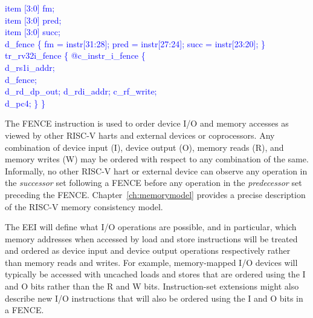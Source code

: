 \textcolor{blue}{
   item [3:0] fm;\\%
\indent item [3:0] pred;\\%
\indent item [3:0] succ;\\%
\indent d\_fence \{ fm = instr[31:28]; pred = instr[27:24]; succ = instr[23:20]; \}\\%
\indent tr\_rv32i\_fence \{ @c\_instr\_i\_fence \{ \\%
\indent \hspace{\parindent} d\_rs1i\_addr; \\%
\indent \hspace{\parindent} d\_fence; \\%
\indent \hspace{\parindent} d\_rd\_dp\_out; d\_rdi\_addr; c\_rf\_write;  \\%
\indent \hspace{\parindent} d\_pc4; \} \} \\%
}

The FENCE instruction is used to order device I/O and
memory accesses as viewed by other RISC-V harts and external devices
or coprocessors.  Any combination of device input (I), device output
(O), memory reads (R), and memory writes (W) may be ordered with
respect to any combination of the same.  Informally, no other RISC-V
hart or external device can observe any operation in the {\em
  successor} set following a FENCE before any operation in the {\em
  predecessor} set preceding the FENCE.
Chapter~\ref{ch:memorymodel} provides a precise description of the
RISC-V memory consistency model.
  
The EEI will define what I/O operations are possible, and in
particular, which memory addresses when accessed by load and store instructions will be treated and
ordered as device input and device output operations respectively
rather than memory reads and writes.  For example, memory-mapped I/O
devices will typically be accessed with uncached loads and stores that
are ordered using the I and O bits rather than the R and W bits.
Instruction-set extensions might also describe new I/O
instructions that will also be ordered using the I and O bits in a
FENCE.

